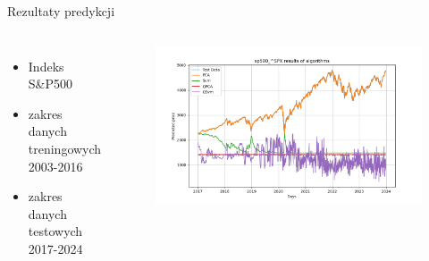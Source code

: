 \begin{frame}{Rezultaty predykcji}
    \begin{columns}[t]
            \begin{itemize}
                \item Indeks S\&P500
                \item zakres danych treningowych 2003-2016
                \item zakres danych testowych 2017-2024
            \end{itemize}
        \centering
        \begin{figure}
            \centering
            \includegraphics[width=1\textwidth]{images/predicted_vs_actual_price.png}
        \end{figure}    
    \end{columns}
\end{frame}

